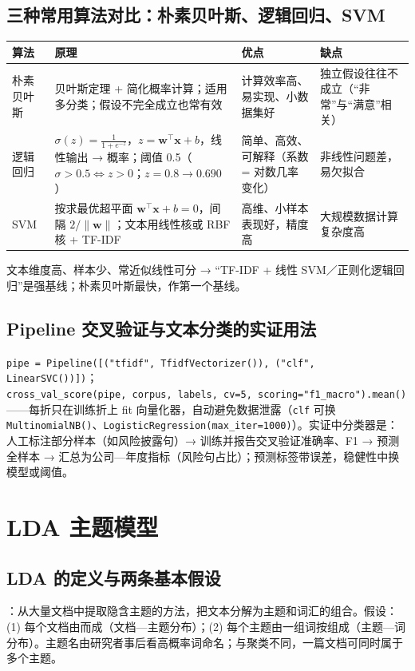 \subsection{三种常用算法对比：朴素贝叶斯、逻辑回归、SVM}
\begin{center}\small
\begin{tabularx}{\linewidth}{@{}p{1.9cm}Lp{3cm}p{2.9cm}@{}}
\toprule
算法 & 原理 & 优点 & 缺点 \\
\midrule
朴素贝叶斯 & 贝叶斯定理 + 简化概率计算；适用多分类；假设不完全成立也常有效 & 计算效率高、易实现、小数据集好 & 独立假设往往不成立（“非常”与“满意”相关）\\
逻辑回归 & $\sigma(z)=\frac{1}{1+e^{-z}}$，$z=\bm w^\top\bm x+b$，线性输出 → 概率；阈值 0.5（$\sigma>0.5\Leftrightarrow z>0$；$z=0.8\to0.690$）& 简单、高效、可解释（系数 = 对数几率变化）& 非线性问题差，易欠拟合 \\
SVM & 按求最优超平面 $\bm w^\top\bm x+b=0$，间隔 $2/\lVert\bm w\rVert$；文本用线性核或 RBF 核 + TF-IDF & 高维、小样本表现好，精度高 & 大规模数据计算复杂度高 \\
\bottomrule
\end{tabularx}
\end{center}
文本维度高、样本少、常近似线性可分 → “TF-IDF + 线性 SVM／正则化逻辑回归”是强基线；朴素贝叶斯最快，作第一个基线。

\subsection{Pipeline 交叉验证与文本分类的实证用法 \texorpdfstring{\tagext}{（拓展）}}
\lstinline|pipe = Pipeline([("tfidf", TfidfVectorizer()), ("clf", LinearSVC())])|；\\ \lstinline|cross_val_score(pipe, corpus, labels, cv=5, scoring="f1_macro").mean()|——每折只在训练折上 fit 向量化器，自动避免数据泄露（\texttt{clf} 可换 \texttt{MultinomialNB()}、\texttt{LogisticRegression(max\_iter=1000)}）。实证中分类器是：人工标注部分样本（如风险披露句）→ 训练并报告交叉验证准确率、F1 → 预测全样本 → 汇总为公司—年度指标（风险句占比）；预测标签带误差，稳健性中换模型或阈值。

\section{LDA 主题模型}

\subsection{LDA 的定义与两条基本假设}
：从大量文档中提取隐含主题的方法，把文本分解为主题和词汇的组合。假设：(1) 每个文档由而成（文档—主题分布）；(2) 每个主题由一组词按组成（主题—词分布）。主题名由研究者事后看高概率词命名；与聚类不同，一篇文档可同时属于多个主题。

